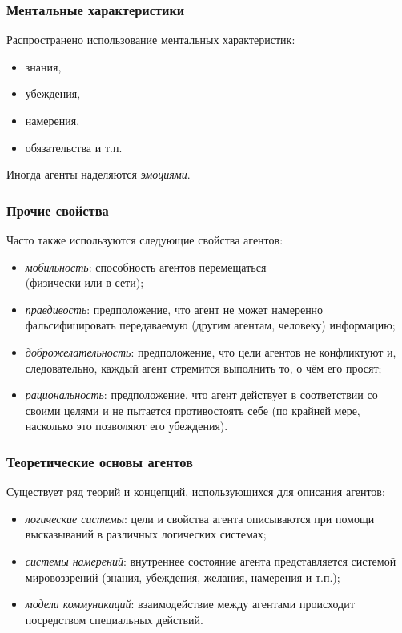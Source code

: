 \documentclass{beamer}
\begin{document}
\begin{frame}
  \frametitle{Ментальные характеристики}
  Распространено использование ментальных характеристик:

  \begin{itemize}
    \item знания,
    \item убеждения,
    \item намерения,
    \item обязательства и т.п.
  \end{itemize}

  Иногда агенты наделяются {\it эмоциями}.
\end{frame}

\begin{frame}
  \frametitle{Прочие свойства}
  Часто также используются следующие свойства агентов:

  \begin{itemize}
    \item<1-> {\it мобильность}: способность агентов перемещаться \\ (физически или в сети);
    \item<2-> {\it правдивость}: предположение, что агент не может намеренно фальсифицировать передаваемую (другим агентам, человеку) информацию;
    \item<3-> {\it доброжелательность}: предположение, что цели агентов не конфликтуют и, следовательно, каждый агент
      стремится выполнить то, о чём его просят;
    \item<4-> {\it рациональность}: предположение, что агент действует в соответствии со своими целями и не пытается
      противостоять себе (по крайней мере, насколько это позволяют его убеждения).
  \end{itemize}
\end{frame}

\begin{frame}
  \frametitle{Теоретические основы агентов}
  Существует ряд теорий и концепций, использующихся для описания агентов:

  \begin{itemize}
    \item {\it логические системы}:
      цели и свойства агента описываются при помощи высказываний
      в различных логических системах;
    \item {\it системы намерений}:
      внутреннее состояние агента представляется системой
      мировоззрений (знания, убеждения, желания, намерения и т.п.);
    \item {\it модели коммуникаций}:
      взаимодействие между агентами происходит посредством специальных
      действий.
  \end{itemize}
\end{frame}
\end{document}
